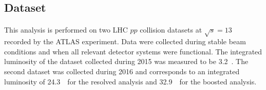 \subsection{Dataset}

\paragraph{}
This analysis is performed on two LHC $pp$ collision datasets at $\sqrt{s} = 13$~\TeV~ recorded by the ATLAS experiment. Data were collected during stable beam conditions and when all relevant detector systems were functional. The integrated luminosity of the dataset collected during 2015 was measured to be 3.2~\ifb.  The second dataset was collected during 2016 and corresponds to an integrated luminosity of 24.3~\ifb\ for the resolved analysis and 32.9~\ifb\ for the boosted analysis.





